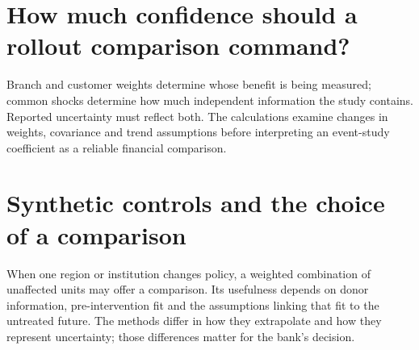 \documentclass[11pt,a4paper,openany]{book}
\begin{document}
























\chapter{How much confidence should a rollout comparison command?}
Branch and customer weights determine whose benefit is being measured;
common shocks determine how much independent information the study contains.
Reported uncertainty must reflect both. The calculations examine changes in
weights, covariance and trend assumptions before interpreting an event-study
coefficient as a reliable financial comparison.



\chapter{Synthetic controls and the choice of a comparison}
When one region or institution changes policy, a weighted combination
of unaffected units may offer a comparison. Its usefulness depends on donor
information, pre-intervention fit and the assumptions linking that fit to the
untreated future. The methods differ in how they extrapolate and how they
represent uncertainty; those differences matter for the bank's decision.
\end{document}
